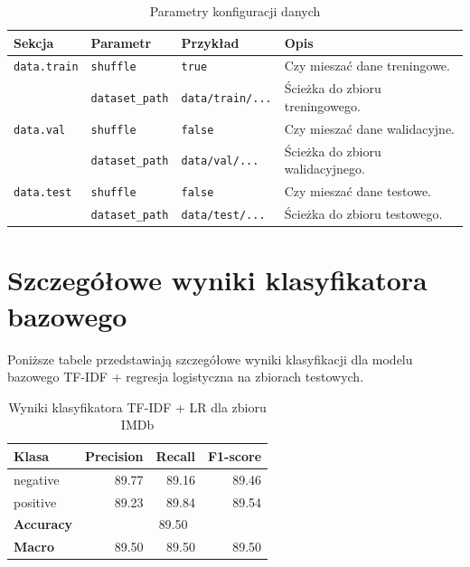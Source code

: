 \documentclass[a4paper,11pt,twoside]{report}
\theoremstyle{definition}
\begin{document}
\begin{table}[h!]
\centering
\caption{Parametry konfiguracji danych}
\label{tab:params_data}
\small
\smallskip
\begin{tabularx}{\textwidth}{@{}lllX@{}}
\toprule
\textbf{Sekcja} & \textbf{Parametr} & \textbf{Przykład} & \textbf{Opis} \\
\midrule
\texttt{data.train} 
    & \texttt{shuffle} & \texttt{true} & Czy mieszać dane treningowe. \\
    & \texttt{dataset\_path} & \texttt{data/train/...} & Ścieżka do zbioru treningowego. \\
\midrule
\texttt{data.val} 
    & \texttt{shuffle} & \texttt{false} & Czy mieszać dane walidacyjne. \\
    & \texttt{dataset\_path} & \texttt{data/val/...} & Ścieżka do zbioru walidacyjnego. \\
\midrule
\texttt{data.test} 
    & \texttt{shuffle} & \texttt{false} & Czy mieszać dane testowe. \\
    & \texttt{dataset\_path} & \texttt{data/test/...} & Ścieżka do zbioru testowego. \\
\bottomrule
\end{tabularx}
\end{table}



\FloatBarrier



\setcounter{table}{0}
\section{Szczegółowe wyniki klasyfikatora bazowego}\label{app:baseline-results}

Poniższe tabele przedstawiają szczegółowe wyniki klasyfikacji dla modelu bazowego TF-IDF + regresja logistyczna na zbiorach testowych.


\begin{table}[h!]
\centering
\caption{Wyniki klasyfikatora TF-IDF + LR dla zbioru IMDb}
\label{tab:baseline-imdb}
\smallskip
\small
\begin{tabular}{@{}lrrr@{}}
\toprule
\textbf{Klasa} & \textbf{Precision} & \textbf{Recall} & \textbf{F1-score} \\
\midrule
negative & 89.77 & 89.16 & 89.46 \\
positive & 89.23 & 89.84 & 89.54 \\
\midrule
\textbf{Accuracy} & \multicolumn{3}{c}{89.50} \\
\textbf{Macro} & 89.50 & 89.50 & 89.50 \\
\bottomrule
\end{tabular}
\end{table}
\end{document}

